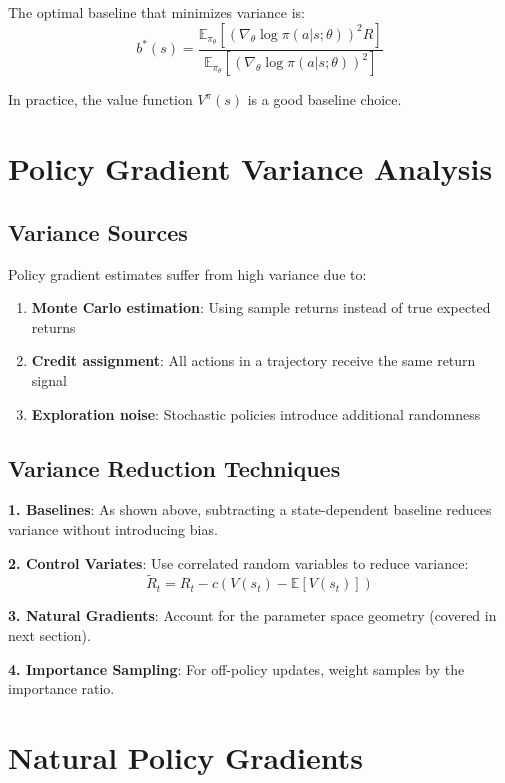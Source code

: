 The optimal baseline that minimizes variance is:
\begin{equation}
b^*(s) = \frac{\mathbb{E}_{\pi_\theta} \left[ (\nabla_\theta \log \pi(a|s; \theta))^2 R \right]}{\mathbb{E}_{\pi_\theta} \left[ (\nabla_\theta \log \pi(a|s; \theta))^2 \right]}
\end{equation}

In practice, the value function $V^\pi(s)$ is a good baseline choice.

\section{Policy Gradient Variance Analysis}

\subsection{Variance Sources}

Policy gradient estimates suffer from high variance due to:

\begin{enumerate}
    \item \textbf{Monte Carlo estimation}: Using sample returns instead of true expected returns
    \item \textbf{Credit assignment}: All actions in a trajectory receive the same return signal
    \item \textbf{Exploration noise}: Stochastic policies introduce additional randomness
\end{enumerate}

\subsection{Variance Reduction Techniques}

\textbf{1. Baselines}: As shown above, subtracting a state-dependent baseline reduces variance without introducing bias.

\textbf{2. Control Variates}: Use correlated random variables to reduce variance:
\begin{equation}
\tilde{R}_t = R_t - c(V(s_t) - \mathbb{E}[V(s_t)])
\end{equation}

\textbf{3. Natural Gradients}: Account for the parameter space geometry (covered in next section).

\textbf{4. Importance Sampling}: For off-policy updates, weight samples by the importance ratio.

\section{Natural Policy Gradients}

